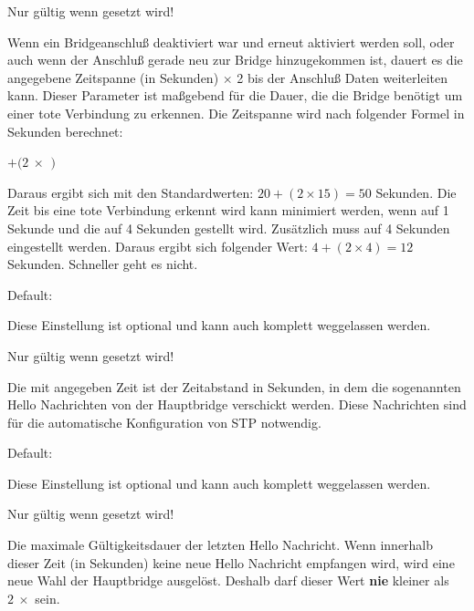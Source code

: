 \begin{description}
  Nur gültig wenn  gesetzt wird!

  Wenn ein Bridgeanschluß deaktiviert war und erneut aktiviert werden
  soll, oder auch wenn der Anschluß gerade neu zur Bridge
  hinzugekommen ist, dauert es die angegebene Zeitspanne (in Sekunden)
  $\times$ 2 bis der Anschluß Daten weiterleiten kann. Dieser
  Parameter ist maßgebend für die Dauer, die die Bridge benötigt um
  einer tote Verbindung zu erkennen.  Die Zeitspanne wird nach
  folgender Formel in Sekunden berechnet:

  \textbf{$ + (2\ \times$ $)$}

  Daraus ergibt sich mit den Standardwerten: $20 + (2 \times 15) = 50$
  Sekunden. Die Zeit bis eine tote Verbindung erkennt wird kann
  minimiert werden, wenn  auf 1 Sekunde und
  die  auf 4 Sekunden gestellt
  wird. Zusätzlich muss  auf 4
  Sekunden eingestellt werden.  Daraus ergibt sich folgender Wert: $4
  + (2 \times 4) = 12$ Sekunden. Schneller geht es nicht.


  Default: 

  Diese Einstellung ist optional und kann auch komplett weggelassen
  werden.

  Nur gültig wenn  gesetzt wird!

  Die mit  angegeben Zeit ist der
  Zeitabstand in Sekunden, in dem die sogenannten Hello Nachrichten
  von der Hauptbridge verschickt werden. Diese Nachrichten sind für
  die automatische Konfiguration von STP notwendig.


  Default: 

  Diese Einstellung ist optional und kann auch komplett weggelassen
  werden.

  Nur gültig wenn  gesetzt wird!

  Die maximale Gültigkeitsdauer der letzten Hello Nachricht. Wenn
  innerhalb dieser Zeit (in Sekunden) keine neue Hello Nachricht
  empfangen wird, wird eine neue Wahl der Hauptbridge
  ausgelöst. Deshalb darf dieser Wert \textbf{nie} kleiner als 
  $2\ \times$  sein.


\end{description}
